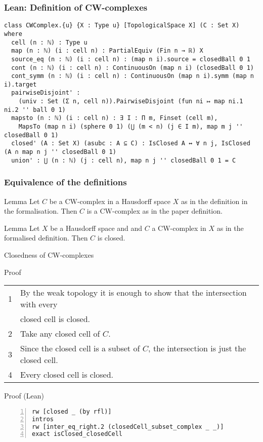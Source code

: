 \documentclass{beamer}
\begin{document}
\begin{frame}[fragile]
\frametitle{Lean: Definition of CW-complexes}
\begin{lstlisting}[basicstyle=\ttfamily\footnotesize]
class CWComplex.{u} {X : Type u} [TopologicalSpace X] (C : Set X) where
  cell (n : ℕ) : Type u
  map (n : ℕ) (i : cell n) : PartialEquiv (Fin n → ℝ) X
  source_eq (n : ℕ) (i : cell n) : (map n i).source = closedBall 0 1
  cont (n : ℕ) (i : cell n) : ContinuousOn (map n i) (closedBall 0 1)
  cont_symm (n : ℕ) (i : cell n) : ContinuousOn (map n i).symm (map n i).target
  pairwiseDisjoint' :
    (univ : Set (Σ n, cell n)).PairwiseDisjoint (fun ni ↦ map ni.1 ni.2 '' ball 0 1)
  mapsto (n : ℕ) (i : cell n) : ∃ I : Π m, Finset (cell m),
    MapsTo (map n i) (sphere 0 1) (⋃ (m < n) (j ∈ I m), map m j '' closedBall 0 1)
  closed' (A : Set X) (asubc : A ⊆ C) : IsClosed A ↔ ∀ n j, IsClosed (A ∩ map n j '' closedBall 0 1)
  union' : ⋃ (n : ℕ) (j : cell n), map n j '' closedBall 0 1 = C
\end{lstlisting}
\end{frame}

\begin{frame}
\frametitle{Equivalence of the definitions}
\begin{block}{Lemma}
  Let $C$ be a CW-complex in a Hausdorff space $X$ as in the definition in the formalisation.
  Then $C$ is a CW-complex as in the paper definition.
\end{block}
\begin{block}{Lemma}
  Let $X$ be a Hausdorff space and and $C$ a CW-complex in $X$ as in the formalised definition.
  Then $C$ is closed.
\end{block}
\end{frame}

\begin{frame}[fragile]{Closedness of CW-complexes}
  \begin{exampleblock}{Proof}
    \small
    \begin{tabular}{ll}
      1& By the weak topology it is enough to show that the intersection with every \\
      & closed cell is closed.\\
      2& Take any closed cell of $C$.\\
      3& Since the closed cell is a subset of $C$, the intersection is just the closed cell.\\
      4& Every closed cell is closed.\\
    \end{tabular}
  \end{exampleblock}
  \begin{exampleblock}{Proof (Lean)}
\begin{lstlisting}[basicstyle=\ttfamily\small, numbers=left, xleftmargin=21pt]
rw [closed _ (by rfl)]
intros
rw [inter_eq_right.2 (closedCell_subset_complex _ _)]
exact isClosed_closedCell
\end{lstlisting}
  \end{exampleblock}

\end{frame}
\end{document}
